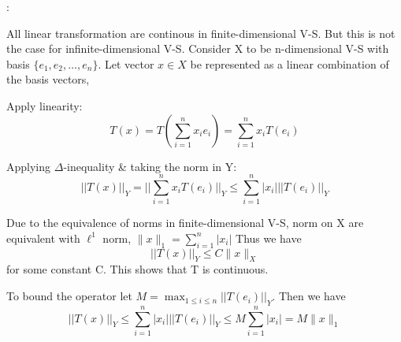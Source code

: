 : 

All linear transformation are continous in finite-dimensional V-S. But this is not the case for infinite-dimensional V-S. Consider X to be n-dimensional V-S with basis $\{e_1, e_2, \dots, e_n\}$. Let vector $x\in X$ be represented as a linear combination of the basis vectors, 

Apply linearity: \[T(x) = T\left(\sum_{i=1}^n x_i e_i\right) = \sum_{i=1}^n x_i T(e_i)\]

Applying $\Delta$-inequality \& taking the norm in Y: \[||T(x)||_Y = ||\sum_{i=1}^n x_i T(e_i)||_Y \leq \sum_{i=1}^n |x_i| ||T(e_i)||_Y\]%

Due to the equivalence of norms in finite-dimensional V-S, norm on X are equivalent with $\ell^1$ norm, $\|x\|_1 = \sum_{i=1}^{n} |x_i|$ Thus we have \[||T(x)||_Y \leq C \|x\|_X\] for some constant C. This shows that T is continuous.

To bound the operator let $M = \max_{1 \leq i \leq n} ||T(e_i)||_Y$. Then we have \[||T(x)||_Y \leq \sum_{i=1}^n |x_i| ||T(e_i)||_Y \leq M \sum_{i=1}^n |x_i| = M \|x\|_1\]